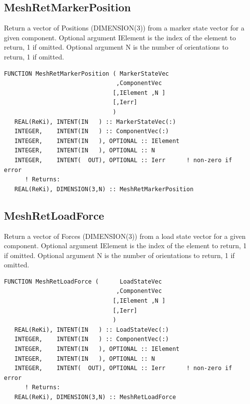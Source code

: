 \documentclass[11pt]{article}
\begin{document}
\subsection{MeshRetMarkerPosition}
Return a vector of Positions (DIMENSION(3)) from a marker state vector for a given component.
Optional argument IElement is the index of the element to return, 1 if omitted.
Optional argument N is the number of orientations to return, 1 if omitted.
\begin{verbatim}
FUNCTION MeshRetMarkerPosition ( MarkerStateVec
                                ,ComponentVec 
                               [,IElement ,N ]
                               [,Ierr]
                               )
   REAL(ReKi), INTENT(IN   ) :: MarkerStateVec(:)
   INTEGER,    INTENT(IN   ) :: ComponentVec(:)
   INTEGER,    INTENT(IN   ), OPTIONAL :: IElement
   INTEGER,    INTENT(IN   ), OPTIONAL :: N
   INTEGER,    INTENT(  OUT), OPTIONAL :: Ierr 		! non-zero if error
      ! Returns:
   REAL(ReKi), DIMENSION(3,N) :: MeshRetMarkerPosition
\end{verbatim}

\subsection{MeshRetLoadForce}
Return a vector of Forces (DIMENSION(3)) from a load state vector for a given component.
Optional argument IElement is the index of the element to return, 1 if omitted.
Optional argument N is the number of orientations to return, 1 if omitted.
\begin{verbatim}
FUNCTION MeshRetLoadForce (      LoadStateVec
                                ,ComponentVec 
                               [,IElement ,N ]
                               [,Ierr]
                               )
   REAL(ReKi), INTENT(IN   ) :: LoadStateVec(:)
   INTEGER,    INTENT(IN   ) :: ComponentVec(:)
   INTEGER,    INTENT(IN   ), OPTIONAL :: IElement
   INTEGER,    INTENT(IN   ), OPTIONAL :: N
   INTEGER,    INTENT(  OUT), OPTIONAL :: Ierr 		! non-zero if error
      ! Returns:
   REAL(ReKi), DIMENSION(3,N) :: MeshRetLoadForce
\end{verbatim}
\end{document}
